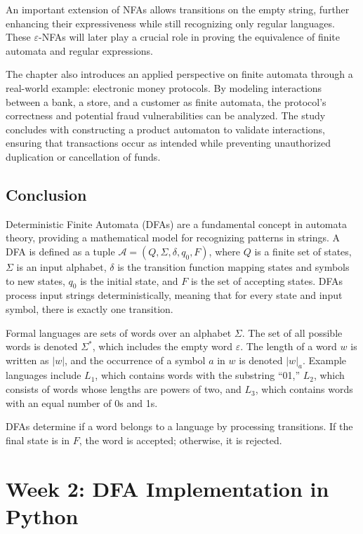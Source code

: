 \documentclass{article}
\theoremstyle{theorem}
\theoremstyle{definition}
\theoremstyle{remark}
\begin{document}
An important extension of NFAs allows transitions on the empty string, further enhancing their expressiveness while still recognizing only regular languages. These \(\varepsilon\)-NFAs will later play a crucial role in proving the equivalence of finite automata and regular expressions.

The chapter also introduces an applied perspective on finite automata through a real-world example: electronic money protocols. By modeling interactions between a bank, a store, and a customer as finite automata, the protocol’s correctness and potential fraud vulnerabilities can be analyzed. The study concludes with constructing a product automaton to validate interactions, ensuring that transactions occur as intended while preventing unauthorized duplication or cancellation of funds.

\subsection{Conclusion}

Deterministic Finite Automata (DFAs) are a fundamental concept in automata theory, providing a mathematical model for recognizing patterns in strings. A DFA is defined as a tuple \(\mathcal{A} = (Q, \Sigma, \delta, q_0, F)\), where \(Q\) is a finite set of states, \(\Sigma\) is an input alphabet, \(\delta\) is the transition function mapping states and symbols to new states, \(q_0\) is the initial state, and \(F\) is the set of accepting states. DFAs process input strings deterministically, meaning that for every state and input symbol, there is exactly one transition.

Formal languages are sets of words over an alphabet \(\Sigma\). The set of all possible words is denoted \(\Sigma^*\), which includes the empty word \(\varepsilon\). The length of a word \(w\) is written as \(|w|\), and the occurrence of a symbol \(a\) in \(w\) is denoted \(|w|_a\). Example languages include \(L_1\), which contains words with the substring “01,” \(L_2\), which consists of words whose lengths are powers of two, and \(L_3\), which contains words with an equal number of 0s and 1s.

DFAs determine if a word belongs to a language by processing transitions. If the final state is in \(F\), the word is accepted; otherwise, it is rejected.

\newpage

\section{Week 2: DFA Implementation in Python}
\end{document}

